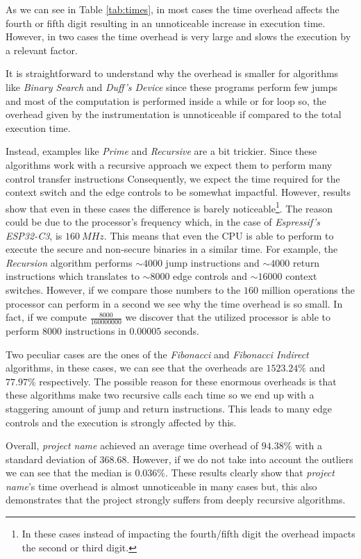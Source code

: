 As we can see in Table \ref{tab:times}, in most cases the time overhead affects the
fourth or fifth digit resulting in an unnoticeable increase in execution time.
However, in two cases the time overhead is very large and slows the execution by
a relevant factor.

It is straightforward to understand why the overhead is smaller for algorithms like
\textit{Binary Search} and \textit{Duff's Device} since these programs perform few
jumps and most of the computation is performed inside a while or for loop so,
the overhead given by the instrumentation is unnoticeable if compared to the
total execution time.

Instead, examples like \textit{Prime} and \textit{Recursive} are a bit trickier.
Since these algorithms work with a recursive approach we expect them to perform
many control transfer instructions Consequently, we expect the time required for
the context switch and the edge controls to be somewhat impactful. However, results
show that even in these cases the difference is barely noticeable\footnote{In
these cases instead of impacting the fourth/fifth digit the overhead impacts the
second or third digit.}. The reason could be due to the processor's frequency which,
in the case of \textit{Espressif's ESP32-C3}, is $160 \ MHz$. This means that even
the CPU is able to perform to execute the secure and non-secure binaries in a similar
time. For example, the \textit{Recursion} algorithm performs $\sim 4000$ jump
instructions and $\sim 4000$ return instructions which translates to $\sim 8000$
edge controls and $\sim 16000$ context switches. However, if we compare those
numbers to the $160$ million operations the processor can perform in a second we
see why the time overhead is so small. In fact, if we compute
$\frac{8000}{160000000}$ we discover that the utilized processor is able to
perform $8000$ instructions in $0.00005$ seconds.

Two peculiar cases are the ones of the \textit{Fibonacci} and \textit{Fibonacci
Indirect} algorithms, in these cases, we can see that the overheads are
$1523.24\%$ and $77.97\%$ respectively. The possible reason for these enormous overheads
is that these algorithms make two recursive calls each time so we end up with a staggering
amount of jump and return instructions. This leads to many edge controls and the
execution is strongly affected by this.

Overall, \textit{project name} achieved an average time overhead of $94.38\%$
with a standard deviation of $368.68$. However, if we do not take into account
the outliers we can see that the median is $0.036\%$. These results clearly show
that \textit{project name}'s time overhead is almost unnoticeable in many cases
but, this also demonstrates that the project strongly suffers from deeply recursive
algorithms.

